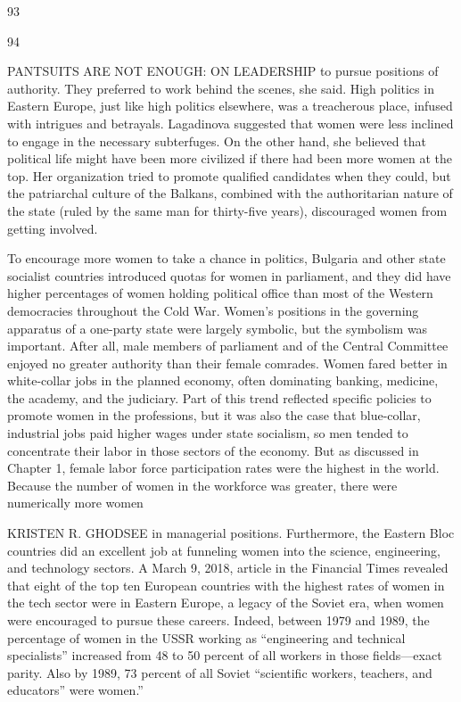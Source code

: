  \par 
93
 \par 
94
 \par 
PANTSUITS ARE NOT ENOUGH: ON LEADERSHIP to pursue positions of authority. They preferred to work behind the scenes, she said. High politics in Eastern Europe, just like high politics elsewhere, was a treacherous place, infused with intrigues and betrayals. Lagadinova suggested that women were less inclined to engage in the necessary subterfuges. On the other hand, she believed that political life might have been more civilized if there had been more women at the top. Her organization tried to promote qualified candidates when they could, but the patriarchal culture of the Balkans, combined with the authoritarian nature of the state (ruled by the same man for thirty-five years), discouraged women from getting involved.
 \par 
To encourage more women to take a chance in politics, Bulgaria and other state socialist countries introduced quotas for women in parliament, and they did have higher percentages of women holding political office than most of the Western democracies throughout the Cold War. Women’s positions in the governing apparatus of a one-party state were largely symbolic, but the symbolism was important. After all, male members of parliament and of the Central Committee enjoyed no greater authority than their female comrades. Women fared better in white-collar jobs in the planned economy, often dominating banking, medicine, the academy, and the judiciary. Part of this trend reflected specific policies to promote women in the professions, but it was also the case that blue-collar, industrial jobs paid higher wages under state socialism, so men tended to concentrate their labor in those sectors of the economy. But as discussed in Chapter 1, female labor force participation rates were the highest in the world. Because the number of women in the workforce was greater, there were numerically more women
 \par 
KRISTEN R. GHODSEE in managerial positions. Furthermore, the Eastern Bloc countries did an excellent job at funneling women into the science, engineering, and technology sectors. A March 9, 2018, article in the Financial Times revealed that eight of the top ten European countries with the highest rates of women in the tech sector were in Eastern Europe, a legacy of the Soviet era, when women were encouraged to pursue these careers. Indeed, between 1979 and 1989, the percentage of women in the USSR working as “engineering and technical specialists” increased from {\color{blue}48} to {\color{blue}50} percent of all workers in those fields—exact parity. Also by 1989, {\color{blue}73} percent of all Soviet “scientific workers, teachers, and educators” were women.”

